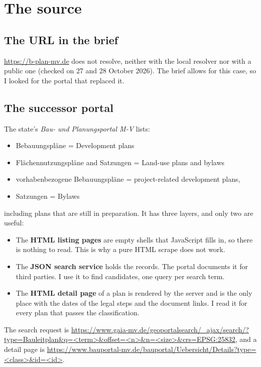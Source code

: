 \documentclass[11pt,a4paper]{article}
\begin{document}
\section{The source}\label{sec:source}

\subsection{The URL in the brief}

\url{https://b-plan-mv.de} does not resolve, neither with the local resolver nor with a public one (checked on 27 and
28 October 2026). The brief allows for this case, so I looked for the portal that replaced it.

\subsection{The successor portal}

The state's \emph{Bau- und Planungsportal M-V} lists:
\begin{itemize}
	\item Bebauungspläne = Development plans
	\item Flächennutzungspläne and Satzungen = Land-use plans and bylaws
	\item vorhabenbezogene Bebauungspläne = project-related development plans,
	\item Satzungen = Bylaws
\end{itemize}
%
including plans that are still in preparation. It has three layers, and only two are
useful:

\begin{itemize}
\item The \textbf{HTML listing pages} are empty shells that JavaScript fills in, so there is nothing to read. This is why
  a pure HTML scrape does not work.
\item The \textbf{JSON search service} holds the records. The portal documents it for third parties. I use it to find
  candidates, one query per search term.
\item The \textbf{HTML detail page} of a plan is rendered by the server and is the only place with the dates of the
  legal steps and the document links. I read it for every plan that passes the classification.
\end{itemize}

{\sloppy The search request is
\url{https://www.gaia-mv.de/geoportalsearch/_ajax/search/?type=Bauleitplan&q=<term>&offset=<n>&n=<size>&crs=EPSG:25832},
and a detail page is
\url{https://www.bauportal-mv.de/bauportal/Uebersicht/Details?type=<class>&id=<id>}.\par}
\end{document}
